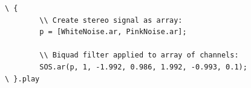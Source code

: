 \documentclass[twoside,a4paper]{article}
\begin{document}
\begin{lstlisting}
\ {
		\\ Create stereo signal as array:
		p = [WhiteNoise.ar, PinkNoise.ar];
		
		\\ Biquad filter applied to array of channels:
		SOS.ar(p, 1, -1.992, 0.986, 1.992, -0.993, 0.1);
\ }.play
\end{lstlisting}

\end{document}
